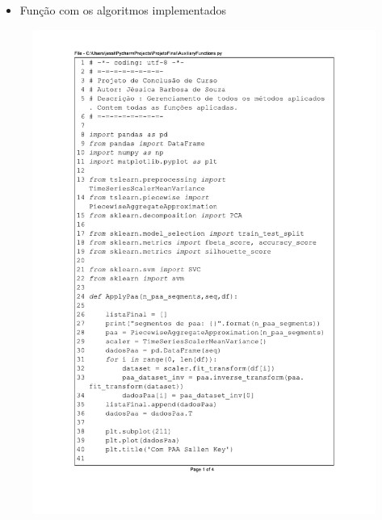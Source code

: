 \begin{itemize}
    \item Função com os algoritmos implementados
\end{itemize}
\begin{figure}[H]
\centering
\includegraphics[scale=0.75]{01_Pre_textuais/code/analisa1.pdf}
\end{figure}

